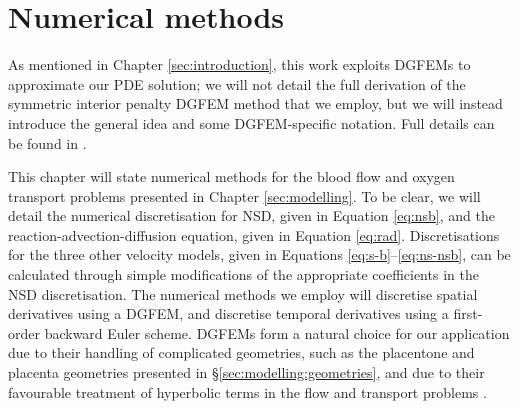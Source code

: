 \chapter{Numerical methods} \label{sec:numerical-methods}   

    As mentioned in Chapter \ref{sec:introduction}, this work exploits DGFEMs to approximate our PDE solution; we will not detail the full derivation of the symmetric interior penalty DGFEM method that we employ, but we will instead introduce the general idea and some DGFEM-specific notation. Full details can be found in \cite{arnoldUnifiedAnalysisDiscontinuous2006,cangianiHpVersionDiscontinuousGalerkin2017}.

    This chapter will state numerical methods for the blood flow and oxygen transport problems presented in Chapter \ref{sec:modelling}. To be clear, we will detail the numerical discretisation for NSD, given in Equation \eqref{eq:nsb}, and the reaction-advection-diffusion equation, given in Equation \eqref{eq:rad}. Discretisations for the three other velocity models, given in Equations \eqref{eq:s-b}--\eqref{eq:ns-nsb}, can be calculated through simple modifications of the appropriate coefficients in the NSD discretisation. The numerical methods we employ will discretise spatial derivatives using a DGFEM, and discretise temporal derivatives using a first-order backward Euler scheme. DGFEMs form a natural choice for our application due to their handling of complicated geometries, such as the placentone and placenta geometries presented in \S\ref{sec:modelling:geometries}, and due to their favourable treatment of hyperbolic terms in the flow and transport problems \cite{cangianiHpVersionDiscontinuousGalerkin2017}.
    
